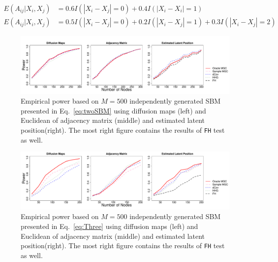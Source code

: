 \documentclass[12pt]{article}
\theoremstyle{definition}
\begin{document}
\begin{equation}
\begin{aligned}
E(A_{ij} | X_{i}, X_{j}) &  =  0.6 I(|X_{i} - X_{j}| = 0) + 0.4 I(|X_{i} - X_{i}| = 1)  \\
E(A_{ij} | X_{i}, X_{j}) & = 0.5 I(|X_{i} - X_{j}| = 0) + 0.2 I(|X_{i} - X_{j}| = 1) + 0.3 I(|X_{i} - X_{j}| = 2)
\end{aligned}
\end{equation}

\begin{figure}[H]
	\centering
	\includegraphics[width=7in]{../Figure/twoSBM.pdf}
	\caption{Empirical power based on $M = 500$ independently generated SBM presented in Eq.~\ref{eq:twoSBM} using diffusion maps (left) and Euclidean of adjacency matrix (middle)  and estimated latent position(right). The most right figure contains the results of \texttt{FH} test as well.}
		\label{fig:twoSBM}
\end{figure}
\begin{figure}[H]
	\centering
	\includegraphics[width=7in]{../Figure/ThreeSBM.pdf}
	\caption{Empirical power based on $M = 500$ independently generated SBM presented in Eq.~\ref{eq:Three} using diffusion maps (left) and Euclidean of adjacency matrix (middle)  and estimated latent position(right). The most right figure contains the results of \texttt{FH} test as well.}
	\label{fig:Three}
\end{figure}	
\end{document}
